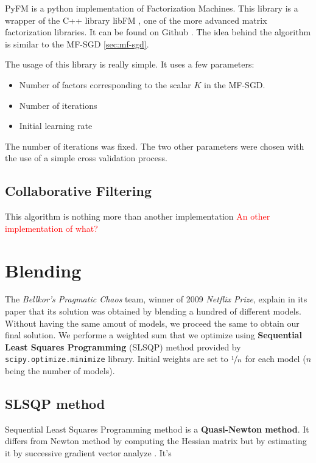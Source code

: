 \documentclass[10pt,conference,compsocconf]{IEEEtran}
\begin{document}
PyFM is a python implementation of Factorization Machines. This library is a wrapper of the C++ library libFM \cite{rendle:tist2012}, one of the more advanced matrix factorization libraries. It can be found on Github \cite{pyfm}. The idea behind the algorithm is similar to the MF-SGD \ref{sec:mf-sgd}. 

The usage of this library is really simple. It uses a few parameters:
\begin{itemize}
 \item Number of factors corresponding to the scalar $K$ in the MF-SGD.
 \item Number of iterations
 \item Initial learning rate
\end{itemize}

The number of iterations was fixed. The two other parameters were chosen with the use of a simple cross validation process.

\subsection{Collaborative Filtering}

This algorithm is nothing more than another implementation \textcolor{red}{An other implementation of what?}

\section{Blending}
\label{sec:blending}

The \textit{Bellkor's Pragmatic Chaos} team, winner of 2009 \textit{Netflix Prize}, explain in its paper that its solution was obtained by blending a hundred of different models. \cite{BellKore_netflix} Without having the same amout of models, we proceed the same to obtain our final solution. We performe a weighted sum that we optimize using \textbf{Sequential Least Squares Programming} (SLSQP) method provided by \texttt{scipy.optimize.minimize} library. Initial weights are set to $\nicefrac{1}{n}$ for each model ($n$ being the number of models). 

\subsection{SLSQP method}
Sequential Least Squares Programming method is a \textbf{Quasi-Newton method}. It differs from Newton method by computing the Hessian matrix but by estimating it by successive gradient vector analyze \cite{wiki:quasi_newton}. It's
\end{document}
